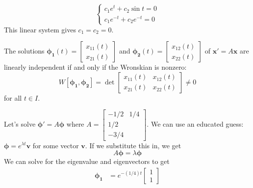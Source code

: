 \begin{itemize}
\begin{example}
\begin{equation}
\begin{cases}
                      c_1e^t + c_2\sin t = 0 \\
                      c_1e^{-t} + c_2e^{-t} = 0
                  \end{cases}
              \end{equation}
              This linear system gives
              $c_1=c_2=0.$
          \end{example}
          \begin{theorem}
              The solutions $\bm{\phi_1}(t) =\begin{bmatrix}
                      x_{11}(t) \\ x_{21}(t)
                  \end{bmatrix}$ and $\bm{\phi_2}(t) =\begin{bmatrix}
                      x_{12}(t) \\ x_{22}(t)
                  \end{bmatrix}$  of $\bm{x}'=A\bm{x}$ are linearly independent if and only if the Wronskian is nonzero:
              \begin{equation}
                  W[\bm{\phi_1},\bm{\phi_2}] = \det\begin{bmatrix}
                      x_{11}(t) & x_{12}(t) \\
                      x_{21}(t) & x_{22}(t)
                  \end{bmatrix} \neq 0
              \end{equation}
              for all $t\in I$.
          \end{theorem}
          \begin{example}
              Let's solve $\bm{\phi}'=A\bm{\phi}$ where $A=\begin{bmatrix}
                      -1/2 & 1/4 \\
                      1/2        \\ -3/4
                  \end{bmatrix}.$ We can use an educated guess: $\bm{\phi} = e^{\lambda t}\bm{v}$ for some vector $\bm{v}$. If we substitute this in, we get
              \begin{equation}
                  A\bm{\phi} = \lambda \bm{\phi}
              \end{equation}
              We can solve for the eigenvalue and eigenvectors to get 
              \begin{align}
                  \bm{\phi_1} &= e^{-(1/4) t} \begin{bmatrix}
                      1 \\ 1

\end{bmatrix}
\end{align}
\end{example}
\end{itemize}

